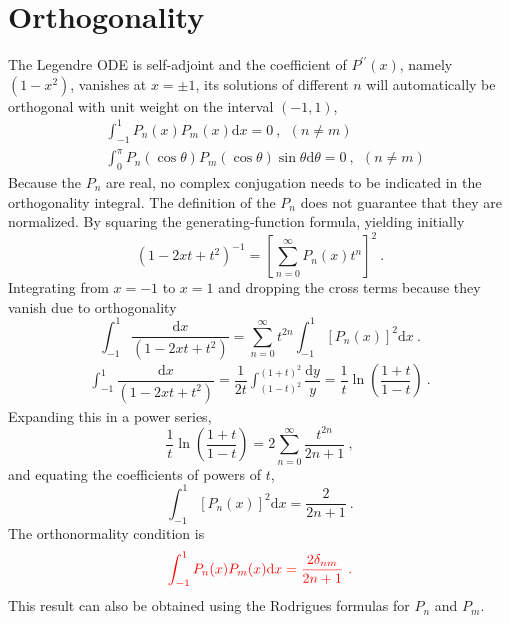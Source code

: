 \documentclass[12pt,a4paper]{article}
\newcommand{\dif}{\mathrm{d}}
\begin{document}
\section{Orthogonality}
\cite{arfken} The Legendre ODE is self-adjoint and the coefficient of $P^{\prime \prime}(x)$, namely $(1- x^2)$, vanishes at $x = \pm 1$, its solutions of different $n$ will automatically be orthogonal with unit weight on the interval $(-1, 1)$,
\begin{align}
& \int_{-1}^1 P_n(x) P_m(x) \dif x = 0 ~, ~~ (n \neq m) \\
& \int_{0}^\pi  P_n(\cos \theta) P_m(\cos \theta) \sin \theta \dif \theta = 0 ~, ~~ (n \neq m)
\end{align}
Because the $P_n$ are real, no complex conjugation needs to be indicated in the orthogonality integral. The definition of the $P_n$ does not guarantee that they are normalized. By squaring the generating-function formula, yielding initially
\begin{equation}
(1-2xt +t^2)^{-1} = \left[\sum_{n=0}^\infty P_n(x) t^n \right]^2 ~.
\end{equation}
Integrating from $x = -1$ to $x = 1$ and dropping the cross terms because they vanish due to orthogonality
\begin{equation}
\int_{-1}^1 \dfrac{\dif x}{(1-2xt +t^2)} = \sum_{n=0}^\infty t^{2n} \int_{-1}^1 \left[P_n(x)  \right]^2 \dif x ~.
\end{equation}
\begin{align}
\int_{-1}^1 \dfrac{\dif x}{(1-2xt +t^2)} = \dfrac{1}{2t} \int_{(1-t)^2}^{(1+t)^2} \dfrac{\dif y}{y} = \dfrac{1}{t}  \ln \left( \dfrac{1+t}{1-t} \right) ~.
\end{align}
Expanding this in a power series,
\begin{equation}
 \dfrac{1}{t}  \ln \left( \dfrac{1+t}{1-t} \right) = 2 \sum_{n=0}^\infty \dfrac{t^{2n}}{2n +1}  ~,
\end{equation}
and equating the coefficients of powers of $t$, 
\begin{equation}
 \int_{-1}^1 \left[P_n(x)  \right]^2 \dif x = \dfrac{2}{2n+1} ~.
\end{equation}
The orthonormality condition is
\begin{equation}
\color{red} \int_{-1}^1 P_n(x) P_m(x) \dif x = \dfrac{2\delta_{nm}}{2n+1} ~.
\end{equation}
This result can also be obtained using the Rodrigues formulas for $P_n$ and $P_m$.
\end{document}
